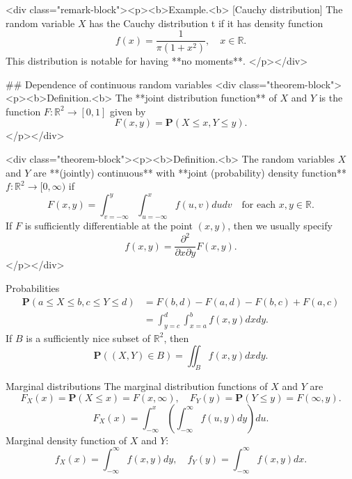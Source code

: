 <div class="remark-block"><p><b>Example.<b> [Cauchy distribution] The random variable $X$ has the Cauchy distribution t if it has density 
function 
$$\begin{equation}
    f(x) = \frac{1}{\pi (1+x^2)}, \quad x \in \mathbb{R}.
\end{equation}$$
This distribution is notable for having **no moments**.
</p></div>

## Dependence of continuous random variables
<div class="theorem-block"><p><b>Definition.<b> 
The **joint distribution function** of $X$ and $Y$ is the function $F: \mathbb{R}^2 \to [0, 1]$ given by 
$$\begin{equation}
    F(x,y) = \mathbf{P}(X\leq x, Y \leq y).
\end{equation}$$
</p></div>

<div class="theorem-block"><p><b>Definition.<b> 
The random variables $X$ and $Y$ are **(jointly) continuous** with **joint (probability) density function** $f : \mathbb{R}^2 \to [0, \infty)$ if
$$\begin{equation}
    F(x, y)=\int_{v=-\infty}^{y} \int_{u=-\infty}^{x} f(u, v) d u d v \quad \text{for each } x, y\in\mathbb{R}. 
\end{equation}$$
If $F$ is sufficiently differentiable at the point $(x , y)$, then we usually specify 
$$\begin{equation}
    f(x, y)=\frac{\partial^{2}}{\partial x \partial y} F(x, y).
\end{equation}$$
</p></div>

\begin{newnotion}{Probabilities}
$$\begin{equation}
    \begin{aligned} 
        \mathbf{P}(a \leq X \leq b, c \leq Y \leq d) &=F(b, d)-F(a, d)-F(b, c)+F(a, c) \\ 
        &=\int_{y=c}^{d} \int_{x=a}^{b} f(x, y) d x d y. \end{aligned}
\end{equation}$$
If $B$ is a sufficiently nice subset of $\mathbb{R}^2$, then
$$\begin{equation}
    \mathbf{P} \left( (X, Y) \in B \right)=\iint_{B} f(x, y) d x d y.
\end{equation}$$
\end{newnotion}
\begin{newnotion}{Marginal distributions}
The marginal distribution functions of $X$ and $Y$ are
$$\begin{equation}
    F_{X}(x)=\mathbf{P}(X \leq x)=F(x, \infty), \quad F_{Y}(y)=\mathbf{P}(Y \leq y)=F(\infty, y). 
\end{equation}$$
$$\begin{equation}
    F_{X}(x)=\int_{-\infty}^{x}\left(\int_{-\infty}^{\infty} f(u, y) d y\right) d u.
\end{equation}$$
Marginal density function of $X$ and $Y$:
$$\begin{equation}
    f_{X}(x)=\int_{-\infty}^{\infty} f(x, y) d y, \quad f_{Y}(y)=\int_{-\infty}^{\infty} f(x, y) d x.
\end{equation}$$
\end{newnotion}

